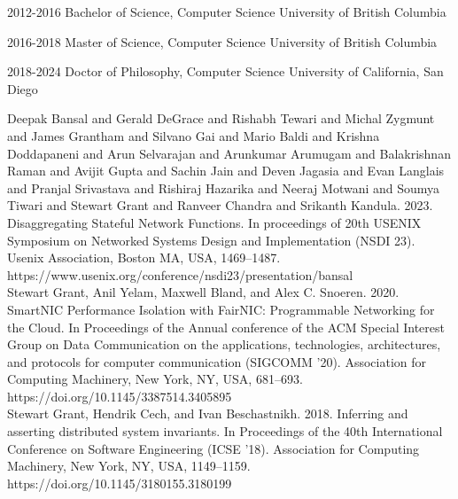 \documentclass[12pt]{ucsddissertation}
\begin{document}
\begin{vita}
\noindent
\begin{cv}{}
\begin{cvlist}{}
\item[2012-2016] Bachelor of Science, Computer Science University of British Columbia
\item[2016-2018] Master of Science, Computer Science University of British Columbia
\item[2018-2024] Doctor of Philosophy, Computer Science University of California, San Diego
\end{cvlist}
\end{cv}

\publications

\noindent Deepak Bansal and Gerald DeGrace and Rishabh Tewari and Michal Zygmunt and James Grantham
and Silvano Gai and Mario Baldi and Krishna Doddapaneni and Arun Selvarajan and Arunkumar Arumugam
and Balakrishnan Raman and Avijit Gupta and Sachin Jain and Deven Jagasia and Evan Langlais and
Pranjal Srivastava and Rishiraj Hazarika and Neeraj Motwani and Soumya Tiwari and Stewart Grant and
Ranveer Chandra and Srikanth Kandula. 2023. Disaggregating Stateful Network Functions. In
proceedings of 20th USENIX Symposium on Networked Systems Design and Implementation (NSDI 23).
Usenix Association, Boston MA, USA, 1469--1487.
https://www.usenix.org/conference/nsdi23/presentation/bansal \\

\noindent Stewart Grant, Anil Yelam, Maxwell Bland, and Alex C. Snoeren. 2020. SmartNIC Performance
Isolation with FairNIC: Programmable Networking for the Cloud. In Proceedings of the Annual
conference of the ACM Special Interest Group on Data Communication on the applications,
technologies, architectures, and protocols for computer communication (SIGCOMM '20). Association for
Computing Machinery, New York, NY, USA, 681–693. https://doi.org/10.1145/3387514.3405895 \\

\noindent Stewart Grant, Hendrik Cech, and Ivan Beschastnikh. 2018. Inferring and asserting
distributed system invariants. In Proceedings of the 40th International Conference on Software
Engineering (ICSE '18). Association for Computing Machinery, New York, NY, USA, 1149–1159.
https://doi.org/10.1145/3180155.3180199 \\


\end{vita}
\end{document}
